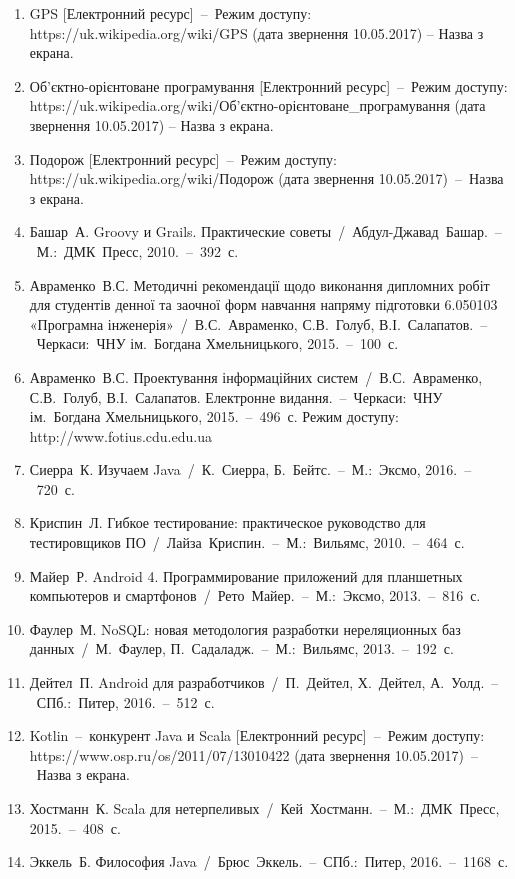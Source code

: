 \documentclass[../main.tex]{subfiles}
\begin{document}
\begin{enumerate}
	\item GPS [Електронний ресурс]~–~Режим доступу: https://uk.wikipedia.org/wiki/GPS (дата звернення 10.05.2017) – Назва з екрана.
	\item Об'єктно-орієнтоване програмування [Електронний ресурс]~–~Режим доступу: https://uk.wikipedia.org/wiki/Об'єктно-орієнтоване\_програмування (дата звернення 10.05.2017) – Назва з екрана.
	\item Подорож [Електронний ресурс]~–~Режим доступу: https://uk.wikipedia.org/wiki/Подорож (дата звернення 10.05.2017)~–~Назва з екрана.
	\item Башар~А. Groovy и Grails. Практические советы~/~Абдул-Джавад~Башар.~–~М.:~ДМК~Пресс, 2010.~–~392~с.
	\item Авраменко~В.С. Методичні рекомендації щодо виконання дипломних робіт для студентів денної та заочної форм навчання напряму підготовки 6.050103 «Програмна інженерія»~/~В.С.~Авраменко, С.В.~Голуб, В.І.~Салапатов.~–~Черкаси:~ЧНУ ім.~Богдана Хмельницького, 2015.~–~100~с.
	\item Авраменко~В.С. Проектування інформаційних систем~/~В.С.~Авраменко, С.В.~Голуб, В.І.~Салапатов. Електронне видання.~–~Черкаси:~ЧНУ ім.~Богдана Хмельницького, 2015.~–~496~с. Режим доступу: http://www.fotius.cdu.edu.ua
	\item Сиерра~К. Изучаем Java~/~К.~Сиерра, Б.~Бейтс.~–~М.:~Эксмо, 2016.~–~720~с.
	\item Криспин~Л. Гибкое тестирование: практическое руководство для тестировщиков ПО~/~Лайза~Криспин.~–~М.:~Вильямс, 2010.~–~464~с.
	\item Майер~Р. Android 4. Программирование приложений для планшетных компьютеров и смартфонов~/~Рето~Майер.~–~М.:~Эксмо, 2013.~–~816~с.
	\item Фаулер~М. NoSQL: новая методология разработки нереляционных баз данных~/~М.~Фаулер, П.~Садаладж.~–~М.:~Вильямс, 2013.~–~192~с.
	\item Дейтел~П. Android для разработчиков~/~П.~Дейтел, Х.~Дейтел, А.~Уолд.~–~СПб.:~Питер, 2016.~–~512~с.
	\item Kotlin~–~конкурент Java и Scala [Електронний ресурс]~–~Режим доступу: https://www.osp.ru/os/2011/07/13010422 (дата звернення 10.05.2017)~–~Назва з екрана.
	\item Хостманн~К. Scala для нетерпеливых~/~Кей~Хостманн.~–~М.:~ДМК~Пресс, 2015.~–~408~с.
	\item Эккель~Б. Философия Java~/~Брюс~Эккель.~–~СПб.:~Питер, 2016.~–~1168~с.
\end{enumerate}
	
\end{document}
